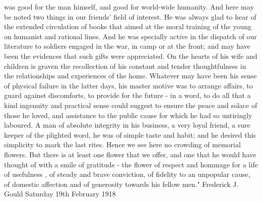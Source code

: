 was good for the man himself, and good for world-wide humanity. And here may be noted two things in our friends' field of interest. He was always glad to hear of the extended circulation of books that aimed at the moral training of the young on humanist and rational lines. And he was specially active in the dispatch of our literature to soldiers engaged in the war, in camp or at the front; and may have been the evidences that such gifts were appreciated.
    On the hearts of his wife and children is graven the recollection of his constant and tender thoughtfulness in the relationships and experiences of the home. Whatever may have been his sense of physical failure in the latter days, his master motive was to arrange affairs, to guard against discomforts, to provide for the future - in a word, to do all that a kind ingenuity and practical sense could suggest to ensure the peace and solace of those he loved, and assistance to the public cause for which he had so untiringly laboured. A man of absolute integrity in his business, a very loyal friend, a sure keeper of the plighted word, he was of simple taste and habit; and he desired this simplicity to mark the last rites. Hence we see here no crowding of memorial flowers. But there is at least one flower that we offer, and one that he would have thought of with a smile of gratitude - the flower of respect and hommage for a life of usefulness , of steady and brave conviction, of fidelity to an unpopular cause, of domestic affection and of generosity towards his fellow men."
    Frederick J. Gould
    Saturday 19th February 1918

	

